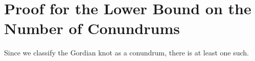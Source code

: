 \appendix
\fancyhead[LO]{\rightmark}
\fancyhead[RO]{\scshape\appendixname\ \thechapter}
\fancyhead[LE]{\scshape\appendixname\ \thechapter}
\fancyhead[RE]{\textsc{\leftmark}}

\chapter[Proof of Upper Bound]{Proof for the Lower Bound on the Number of
  Conundrums}
Since we classify the Gordian knot as a conundrum, there is at least one such.

\clearpage